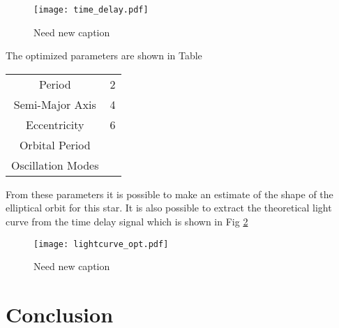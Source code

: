 \documentclass[]{article}
\begin{document}
\begin{figure}[H]
    \centering
    \texttt{[image: time\_delay.pdf]}
      \caption{Need new caption}
      \label{fig:timedelay}
\end{figure}

The optimized parameters are shown in Table 

\begin{tabular}{c|c}
\hline
    Period  & 2  \\
    Semi-Major Axis & 4\\
    Eccentricity & 6\\
    Orbital Period & \\
    Oscillation Modes & \\
\end{tabular}

\noindent
From these parameters it is possible to make an estimate of the shape of the elliptical orbit for this star.
It is also possible to extract the theoretical light curve from the time delay signal which is shown in Fig \ref{fig:LightcurveOptimized}
\begin{figure}[H]
    \centering
    \texttt{[image: lightcurve\_opt.pdf]}
      \caption{Need new caption}
      \label{fig:LightcurveOptimized}
\end{figure}

\section{Conclusion}


        

\end{document}

